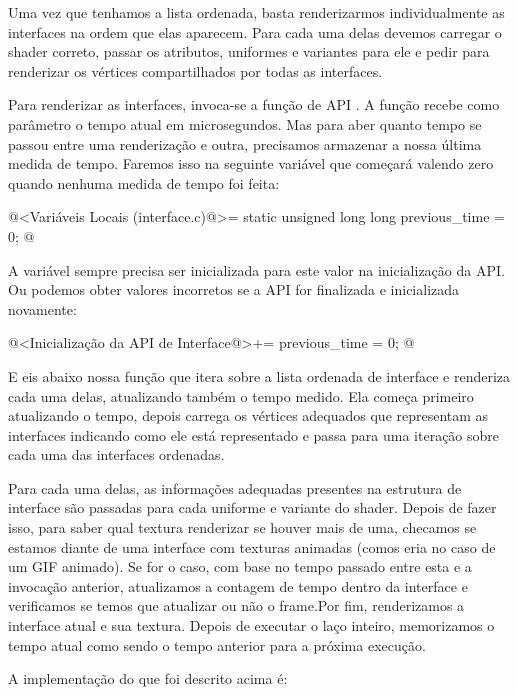 Uma vez que tenhamos a lista ordenada, basta renderizarmos
individualmente as interfaces na ordem que elas aparecem. Para cada
uma delas devemos carregar o shader correto, passar os atributos,
uniformes e variantes para ele e pedir para renderizar os vértices
compartilhados por todas as interfaces.

Para renderizar as interfaces, invoca-se a função de
API . A função recebe como parâmetro
o tempo atual em microsegundos. Mas para aber quanto tempo se passou
entre uma renderização e outra, precisamos armazenar a nossa última
medida de tempo. Faremos isso na seguinte variável que começará
valendo zero quando nenhuma medida de tempo foi feita:

\iniciocodigo
@<Variáveis Locais (interface.c)@>=
static unsigned long long previous_time = 0;
@
\fimcodigo

A variável sempre precisa ser inicializada para este valor na
inicialização da API. Ou podemos obter valores incorretos se a API for
finalizada e inicializada novamente:

\iniciocodigo
@<Inicialização da API de Interface@>+=
previous_time = 0;
@
\fimcodigo

E eis abaixo nossa função que itera sobre a lista ordenada de
interface e renderiza cada uma delas, atualizando também o tempo
medido. Ela começa primeiro atualizando o tempo, depois carrega os
vértices adequados que representam as interfaces indicando como ele
está representado e passa para uma iteração sobre cada uma das
interfaces ordenadas.

Para cada uma delas, as informações adequadas presentes na estrutura
de interface são passadas para cada uniforme e variante do
shader. Depois de fazer isso, para saber qual textura renderizar se
houver mais de uma, checamos se estamos diante de uma interface com
texturas animadas (comos eria no caso de um GIF animado). Se for o
caso, com base no tempo passado entre esta e a invocação anterior,
atualizamos a contagem de tempo dentro da interface e verificamos se
temos que atualizar ou não o frame.Por fim, renderizamos a interface
atual e sua textura. Depois de executar o laço inteiro, memorizamos o
tempo atual como sendo o tempo anterior para a próxima execução.

A implementação do que foi descrito acima é:


